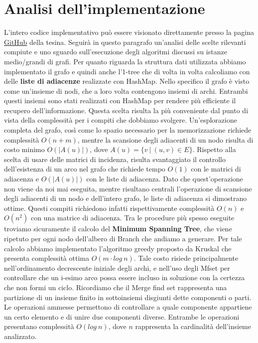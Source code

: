 \documentclass[
	article,			%
	12pt,				%
	oneside,			%
	a4paper,			%
	english,			%
	italian,				%
	sumario=tradicional,
	]{abntex2}
\begin{document}
\section{Analisi dell'implementazione}
L'intero codice implementativo può essere visionato direttamente presso la pagina \href{https://github.com/LorenzoSciandra/TesinaOttimizzazioneCombinatoria}{GitHub} della tesina. Seguirà in questo paragrafo un'analisi delle scelte rilevanti compiute e uno sguardo sull'esecuzione degli algoritmi discussi su istanze medio/grandi di grafi.
\newline
\newline
Per quanto riguarda la struttura dati utilizzata abbiamo implementato il grafo e quindi anche l'1-tree che di volta in volta calcoliamo con delle \textbf{liste di adiacenze} realizzate con HashMap. Nello specifico il grafo è visto come un'insieme di nodi, che a loro volta contengono insiemi di archi. Entrambi questi insiemi sono stati realizzati con HashMap per rendere più efficiente il recupero dell'informazione. Questa scelta risulta la più conveniente dal punto di vista della complessità per i compiti che dobbiamo svolgere. Un'esplorazione completa del grafo, così come lo spazio necessario per la memorizzazione richiede complessità $O(n+m)$, mentre la scansione degli adiacenti di un nodo risulta di costo minimo $O(|A(u)|)$, dove $A(u) = \{v \:|\: (u,v) \in E\}$.
\newline
Rispetto alla scelta di usare delle matrici di incidenza, risulta svantaggiato il controllo dell'esistenza di un arco nel grafo che richiede tempo $O(1)$ con le matrici di adiacenza e $O(|A(u)|)$ con le liste di adiacenza. Dato che quest'operazione non viene da noi mai eseguita, mentre risultano centrali l'operazione di scansione degli adiacenti di un nodo e dell'intero grafo, le liste di adiacenza si dimostrano ottime. Questi compiti richiedono infatti rispettivamente complessità $O(n)$ e $O(n^2)$ con una matrice di adiacenza. 
\newline
\newline
Tra le procedure più spesso eseguite troviamo sicuramente il calcolo del \textbf{Minimum Spanning Tree}, che viene ripetuto per ogni nodo dell'albero di Branch che andiamo a generare. Per tale calcolo abbiamo implementato l'algoritmo greedy proposto da Kruskal che presenta complessità ottima $O(m \cdot log\:n)$. Tale costo risiede principalmente nell'ordinamento decrescente iniziale degli archi, e nell'uso degli Mfset per controllare che un i-esimo arco possa essere incluso in soluzione con la certezza che non formi un ciclo. Ricordiamo che il Merge find set rappresenta una partizione di un insieme finito in sottoinsiemi disgiunti dette componenti o parti. Le operazioni ammesse permettono di controllare a quale componente appartiene un certo elemento e di unire due componenti diverse. Entrambe le operazioni presentano complessità $O(log\: n)$, dove $n$ rappresenta la cardinalità dell'insieme analizzato.
\end{document}
